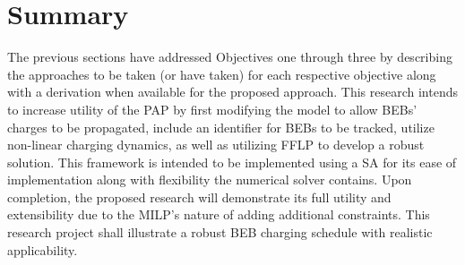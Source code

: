 \documentclass[ee,msthesis]{usuthesis}
\begin{document}
\section{Summary}
\label{sec:approach-summary}
The previous sections have addressed Objectives one through three by describing the approaches to be taken (or have
taken) for each respective objective along with a derivation when available for the proposed approach. This research
intends to increase utility of the PAP by first modifying the model to allow BEBs' charges to be propagated, include an
identifier for BEBs to be tracked, utilize non-linear charging dynamics, as well as utilizing FFLP to develop a robust
solution. This framework is intended to be implemented using a SA for its ease of implementation along with flexibility
the numerical solver contains. Upon completion, the proposed research will demonstrate its full utility and
extensibility due to the MILP's nature of adding additional constraints. This research project shall illustrate a robust
BEB charging schedule with realistic applicability.

\end{document}
